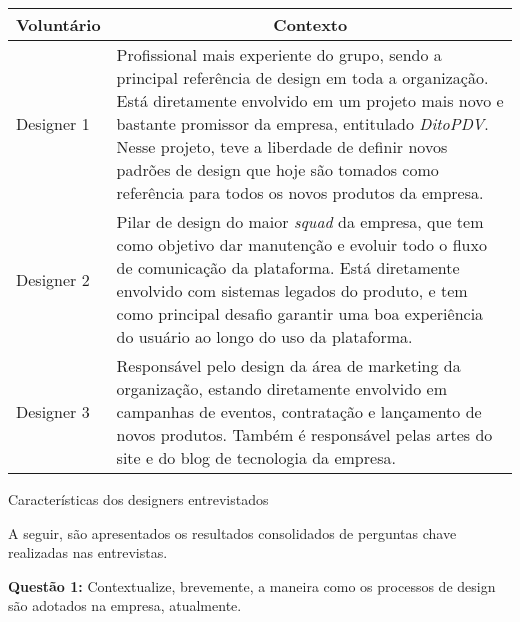\begin{quadro}
\centering
\begin{tabular}{|m{4cm}|m{10cm}|} \hline
	
	\multicolumn{1}{|c|}{\bfseries Voluntário} & \multicolumn{1}{c|}{\bfseries Contexto} \\\hline
	
	 Designer 1 & Profissional mais experiente do grupo, sendo a principal referência de design em toda a organização. Está diretamente envolvido em um projeto mais novo e bastante promissor da empresa, entitulado \textit{DitoPDV}. Nesse projeto, teve a liberdade de definir novos padrões de design que hoje são tomados como referência para todos os novos produtos da empresa. \\\hline
	 
	 Designer 2 & Pilar de design do maior \textit{squad} da empresa, que tem como objetivo dar manutenção e evoluir todo o fluxo de comunicação da plataforma. Está diretamente envolvido com sistemas legados do produto, e tem como principal desafio garantir uma boa experiência do usuário ao longo do uso da plataforma. \\\hline
	 
	 Designer 3 &  Responsável pelo design da área de marketing da organização, estando diretamente envolvido em campanhas de eventos, contratação e lançamento de novos produtos. Também é responsável pelas artes do site e do blog de tecnologia da empresa. \\\hline
    
\end{tabular}
\caption{Características dos designers entrevistados}
\label{table:designersResearch}
\end{quadro}

A seguir, são apresentados os resultados consolidados de perguntas chave realizadas nas entrevistas.

\textbf{Questão 1:} Contextualize, brevemente, a maneira como os processos de design são adotados na empresa, atualmente.

